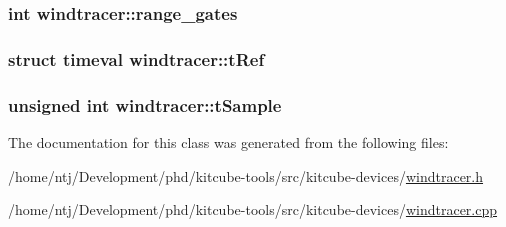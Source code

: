 \hypertarget{classwindtracer_a6352be627e3d05ee0767550ede2654b6}{
\subsubsection[{range\-\_\-gates}]{\setlength{\rightskip}{0pt plus 5cm}int windtracer\-::range\-\_\-gates\hspace{0.3cm}{\ttfamily [private]}}}\label{classwindtracer_a6352be627e3d05ee0767550ede2654b6}
\hypertarget{classwindtracer_ac5ff90382dacf3ee0a23602f7416b3b5}{
\subsubsection[{t\-Ref}]{\setlength{\rightskip}{0pt plus 5cm}struct timeval windtracer\-::t\-Ref\hspace{0.3cm}{\ttfamily [private]}}}\label{classwindtracer_ac5ff90382dacf3ee0a23602f7416b3b5}
\hypertarget{classwindtracer_ac1445c6c8d23eb15c58034163ca8aacd}{
\subsubsection[{t\-Sample}]{\setlength{\rightskip}{0pt plus 5cm}unsigned int windtracer\-::t\-Sample\hspace{0.3cm}{\ttfamily [private]}}}\label{classwindtracer_ac1445c6c8d23eb15c58034163ca8aacd}


The documentation for this class was generated from the following files\-:\begin{DoxyCompactItemize}
\item 
/home/ntj/\-Development/phd/kitcube-\/tools/src/kitcube-\/devices/\hyperlink{windtracer_8h}{windtracer.\-h}\item 
/home/ntj/\-Development/phd/kitcube-\/tools/src/kitcube-\/devices/\hyperlink{windtracer_8cpp}{windtracer.\-cpp}\end{DoxyCompactItemize}
